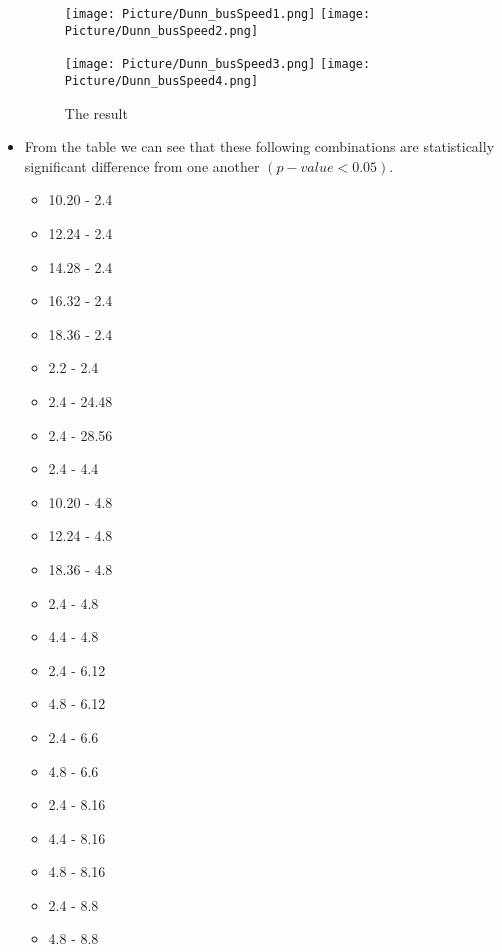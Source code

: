 \documentclass[a4paper]{article}
\begin{document}
\begin{itemize}
    \begin{figure}[H]
        \centering
        \texttt{[image: Picture/Dunn\_busSpeed1.png]}
        \hfill
        \texttt{[image: Picture/Dunn\_busSpeed2.png]}
        \label{7.4.9}
    \end{figure}
    
    \begin{figure}[H]
        \centering
        \texttt{[image: Picture/Dunn\_busSpeed3.png]}
        \hfill
        \texttt{[image: Picture/Dunn\_busSpeed4.png]}
        \caption{The result}
        \label{7.4.10}
    \end{figure}
    
    \item[] From the table we can see that these following combinations are statistically significant difference from one another $(p-value < 0.05)$.
    \begin{itemize}
        \item[] 10.20 - 2.4
        \item[] 12.24 - 2.4
        \item[] 14.28 - 2.4
        \item[] 16.32 - 2.4
        \item[] 18.36 - 2.4
        \item[] 2.2 - 2.4
        \item[] 2.4 - 24.48
        \item[] 2.4 - 28.56
        \item[] 2.4 - 4.4
        \item[] 10.20 - 4.8
        \item[] 12.24 - 4.8
        \item[] 18.36 - 4.8
        \item[] 2.4 - 4.8
        \item[] 4.4 - 4.8
        \item[] 2.4 - 6.12
        \item[] 4.8 - 6.12
        \item[] 2.4 - 6.6
        \item[] 4.8 - 6.6
        \item[] 2.4 - 8.16
        \item[] 4.4 - 8.16
        \item[] 4.8 - 8.16
        \item[] 2.4 - 8.8
        \item[] 4.8 - 8.8
    \end{itemize}
\end{itemize}
\end{document}
